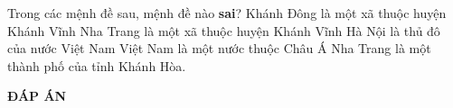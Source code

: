 \begin{ex}%
Trong các mệnh đề sau, mệnh đề nào \textbf{sai}?
\choice
{Khánh Đông là một xã thuộc huyện Khánh Vĩnh}
{\True Nha Trang là một xã thuộc huyện Khánh Vĩnh}
{Hà Nội là thủ đô của nước Việt Nam}
{Việt Nam là một nước thuộc Châu Á}
\loigiai
{Nha Trang là một thành phố của tỉnh Khánh Hòa.}
\end{ex}
\newpage
\begin{center}
	\textbf{ĐÁP ÁN}
\end{center}
\begin{multicols}{10}
	 
\end{multicols}


